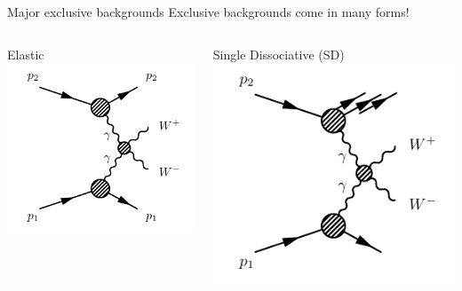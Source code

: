 \documentclass[10pt]{beamer}
\begin{document}
\begin{frame}{Major exclusive backgrounds}
\centering
{\color{blue}\large Exclusive backgrounds come in many forms!}
\vspace*{\baselineskip}
\begin{columns}
	\begin{column}{0.33\linewidth}
	\centering
	Elastic
   \includegraphics[width=\textwidth]{figures/exclWW.pdf}
	\end{column}
	\begin{column}{0.33\linewidth}
\centering
Single Dissociative (SD)
   \includegraphics[width=\textwidth]{figures/exclWWsd.pdf}

\end{column}
\end{columns}
\end{frame}
\end{document}
